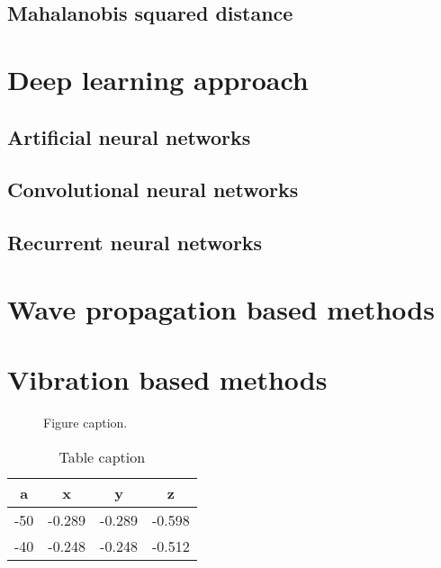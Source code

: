 \documentclass[b5paper, 11pt, openany, titlepage]{book}
\begin{document}
\subsection{Mahalanobis squared distance}
\section{Deep learning approach}
\subsection{Artificial neural networks}
\subsection{Convolutional neural networks}
\subsection{Recurrent neural networks}
\section{Wave propagation based methods}
\section{Vibration based methods}


\begin{figure} [h!]
	\begin{center}
	\end{center}
	\caption{Figure caption.} 
	\label{fig:bc}
\end{figure}

\begin{table}[h]
\centering
	\caption{Table caption}
	\begin{tabular}{cccc}
		\hline
	\textbf{a}	& \textbf{x} & \textbf{y} & \textbf{z} \\
		\hline
		-50 & -0.289 & -0.289 & -0.598\\ 
		-40 & -0.248 & -0.248 & -0.512\\ 
		\hline 
	\end{tabular} 
	\label{tab:xyz}
\end{table}
\end{document}
